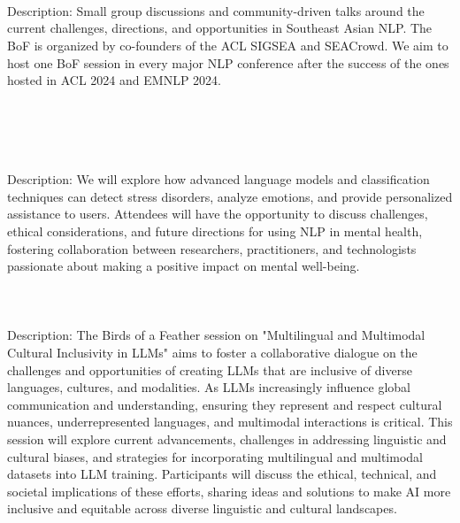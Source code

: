 \\
\\
\\
Description: Small group discussions and community-driven talks around the current challenges, directions, and opportunities in Southeast Asian NLP. The BoF is organized by co-founders of the ACL SIGSEA and SEACrowd. We aim to host one BoF session in every major NLP conference after the success of the ones hosted in ACL 2024 and EMNLP 2024.\\

\\  \vspace*{-0.1cm} \leavevmode\newline

 \\
\\
\\
Description: We will explore how advanced language models and classification techniques can detect stress disorders, analyze emotions, and provide personalized assistance to users. Attendees will have the opportunity to discuss challenges, ethical considerations, and future directions for using NLP in mental health, fostering collaboration between researchers, practitioners, and technologists passionate about making a positive impact on mental well-being.\\

\\
\\
\\
Description: The Birds of a Feather session on "Multilingual and Multimodal Cultural Inclusivity in LLMs" aims to foster a collaborative dialogue on the challenges and opportunities of creating LLMs that are inclusive of diverse languages, cultures, and modalities. As LLMs increasingly influence global communication and understanding, ensuring they represent and respect cultural nuances, underrepresented languages, and multimodal interactions is critical. This session will explore current advancements, challenges in addressing linguistic and cultural biases, and strategies for incorporating multilingual and multimodal datasets into LLM training. Participants will discuss the ethical, technical, and societal implications of these efforts, sharing ideas and solutions to make AI more inclusive and equitable across diverse linguistic and cultural landscapes.\\

